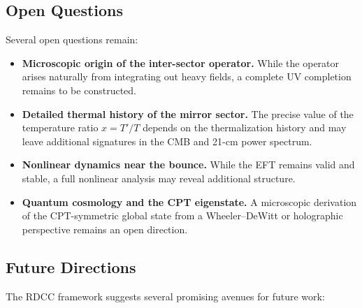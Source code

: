 \documentclass[11pt,a4paper]{article}
\begin{document}
\subsection*{Open Questions}

Several open questions remain:

\begin{itemize}
    \item \textbf{Microscopic origin of the inter-sector operator.}
    While the operator arises naturally from integrating out heavy fields, a
    complete UV completion remains to be constructed.

    \item \textbf{Detailed thermal history of the mirror sector.}
    The precise value of the temperature ratio \(x = T'/T\) depends on the
    thermalization history and may leave additional signatures in the CMB and
    21-cm power spectrum.

    \item \textbf{Nonlinear dynamics near the bounce.}
    While the EFT remains valid and stable, a full nonlinear analysis may reveal
    additional structure.

    \item \textbf{Quantum cosmology and the CPT eigenstate.}
    A microscopic derivation of the CPT-symmetric global state from a
    Wheeler--DeWitt or holographic perspective remains an open direction.
\end{itemize}

\subsection*{Future Directions}

The RDCC framework suggests several promising avenues for future work:
\end{document}

